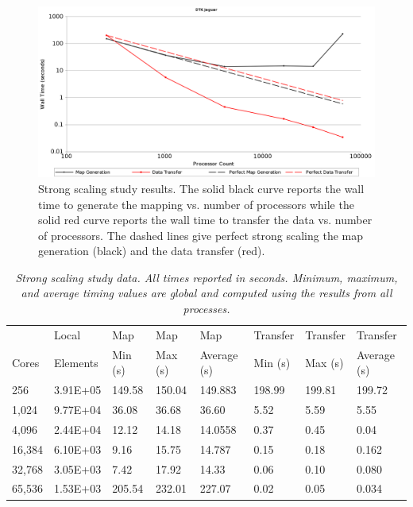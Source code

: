 \documentclass{mc2013}
\begin{document}
\begin{figure}[htpb!]
  \centering
  \includegraphics[width=5.5in]{StrongScaling.png}
  \caption{Strong scaling study results. The solid black curve reports
    the wall time to generate the mapping vs. number of processors
    while the solid red curve reports the wall time to transfer the
    data vs. number of processors. The dashed lines give
    perfect strong scaling the map generation (black) and the data
    transfer (red).}
  \label{fig:strong_scaling}
\end{figure}

\begin{table}[htpb!]
  \begin{center}
    \begin{tabular}{llllllll}\hline\hline
      \multicolumn{1}{l}{}& 
      \multicolumn{1}{l}{Local} & 
      \multicolumn{1}{l}{Map} & 
      \multicolumn{1}{l}{Map} & 
      \multicolumn{1}{l}{Map} & 
      \multicolumn{1}{l}{Transfer} & 
      \multicolumn{1}{l}{Transfer} & 
      \multicolumn{1}{l}{Transfer}\\
      \multicolumn{1}{l}{Cores} & 
      \multicolumn{1}{l}{Elements} & 
      \multicolumn{1}{l}{Min (s)} & 
      \multicolumn{1}{l}{Max (s)} & 
      \multicolumn{1}{l}{Average (s)} & 
      \multicolumn{1}{l}{Min (s)} & 
      \multicolumn{1}{l}{Max (s)} & 
      \multicolumn{1}{l}{Average (s)}\\ \hline\hline
256 &	3.91E+05 & 149.58&	150.04 & 149.883 & 198.99 & 199.81 & 199.72 \\
1,024 &	9.77E+04 & 36.08 &	36.68 &	36.60 &	5.52 &	5.59 &	5.55 \\
4,096 &	2.44E+04 & 12.12 &	14.18 &	14.0558 &	0.37 &	0.45 &	0.04 \\
16,384 &	6.10E+03 & 9.16 &	15.75 & 14.787	& 0.15 & 0.18 &	0.162 \\
32,768 &	3.05E+03 & 7.42 &	17.92 &	14.33 & 0.06 &	0.10 &	0.080 \\
65,536 &	1.53E+03 & 205.54 &	232.01 & 227.07 & 0.02 & 0.05 &	0.034 \\
      \hline\hline
    \end{tabular}
  \end{center}
  \caption{\sl Strong scaling study data. All times reported in
    seconds. Minimum, maximum, and average timing values are global
    and computed using the results from all processes.}
  \label{tab:strong_scaling}
\end{table}
\end{document}
